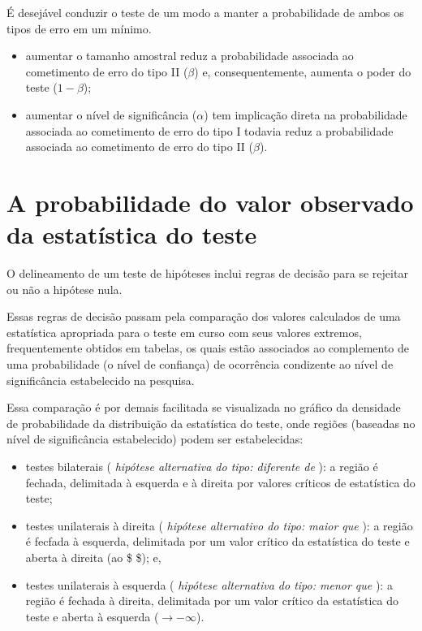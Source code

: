 \documentclass[
]{book}
\providecommand{\tightlist}{%
  \setlength{\itemsep}{0pt}\setlength{\parskip}{0pt}}
\begin{document}
\hfill\break

É desejável conduzir o teste de um modo a manter a probabilidade de ambos os tipos de erro em um mínimo.

\hfill\break

\begin{itemize}
\tightlist
\item
  aumentar o tamanho amostral reduz a probabilidade associada ao cometimento de erro do tipo II (\(\beta\)) e, consequentemente, aumenta o poder do teste (\(1- \beta\));
\item
  aumentar o nível de significância (\(\alpha\)) tem implicação direta na probabilidade associada ao cometimento de erro do tipo I todavia reduz a probabilidade associada ao cometimento de erro do tipo II (\(\beta\)).
\end{itemize}

\hfill\break

\hypertarget{a-probabilidade-do-valor-observado-da-estatuxedstica-do-teste}{%
\section{A probabilidade do valor observado da estatística do teste}\label{a-probabilidade-do-valor-observado-da-estatuxedstica-do-teste}}

O delineamento de um teste de hipóteses inclui regras de decisão para se rejeitar ou não a hipótese nula.

\hfill\break

Essas regras de decisão passam pela comparação dos valores calculados de uma estatística apropriada para o teste em curso com seus valores extremos, frequentemente obtidos em tabelas, os quais estão associados ao complemento de uma probabilidade (o nível de confiança) de ocorrência condizente ao nível de significância estabelecido na pesquisa.

\hfill\break

Essa comparação é por demais facilitada se visualizada no gráfico da densidade de probabilidade da distribuição da estatística do teste, onde regiões (baseadas no nível de significância estabelecido) podem ser estabelecidas:

\begin{itemize}
\tightlist
\item
  testes bilaterais ( \emph{hipótese alternativa do tipo: diferente de} ): a região é fechada, delimitada à esquerda e à direita por valores críticos de estatística do teste;
\item
  testes unilaterais à direita ( \emph{hipótese alternativo do tipo: maior que} ): a região é fecfada à esquerda, delimitada por um valor crítico da estatística do teste e aberta à direita (ao \$ \to \infty\$); e,
\item
  testes unilaterais à esquerda ( \emph{hipótese alternativa do tipo: menor que} ): a região é fechada à direita, delimitada por um valor crítico da estatística do teste e aberta à esquerda (\(\to -\infty\)).
\end{itemize}
\end{document}
